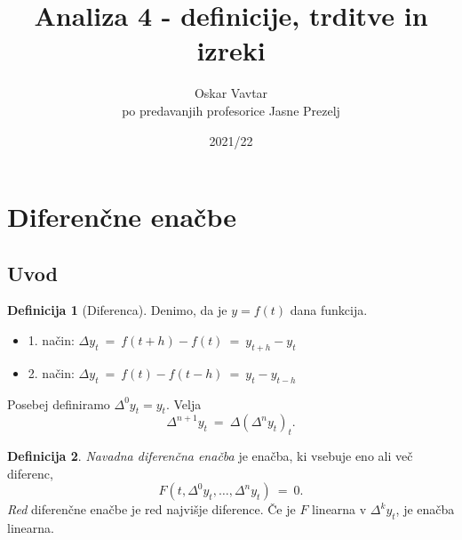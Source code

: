 \documentclass[11pt]{article}
\title{Analiza 4 - definicije, trditve in izreki}
\author{Oskar Vavtar \\
po predavanjih profesorice Jasne Prezelj}
\date{2021/22}
\newcommand{\dif}{\Delta}
\newcommand{\0}{\mathbf{0}}
\theoremstyle{definition}
\newtheorem{definicija}{Definicija}[section]
\theoremstyle{definition}
\theoremstyle{definition}
\theoremstyle{definition}
\begin{document}
\maketitle
\pagebreak
\tableofcontents
\pagebreak


\section{Diferenčne enačbe}
\vspace{0.5cm}


\subsection{Uvod}
\vspace{0.5cm}

\begin{definicija}[Diferenca]

Denimo, da je $y=f(t)$ dana funkcija.
\begin{itemize}
	\item 1. način: $\dif y_t ~=~ f(t+h) - f(t) ~=~ y_{t+h} - y_t$
	\item 2. način: $\dif y_t ~=~ f(t) - f(t-h) ~=~ y_t - y_{t-h}$
\end{itemize}
Posebej definiramo $\dif^0 y_t = y_t$. Velja
$$\dif^{n+1} y_t ~=~ \dif(\dif^n y_t)_t.$$

\end{definicija}
\vspace{0.5cm}

\begin{definicija}

\textit{Navadna diferenčna enačba} je enačba, ki vsebuje eno ali več diferenc,
$$F(t, \dif^0 y_t, \ldots, \dif^n y_t) ~=~ 0.$$
\textit{Red} diferenčne enačbe je red najvišje diference. Če je $F$ linearna v $\dif^k y_t$, je enačba linearna.

\end{definicija}
\vspace{0.5cm}
\end{document}
